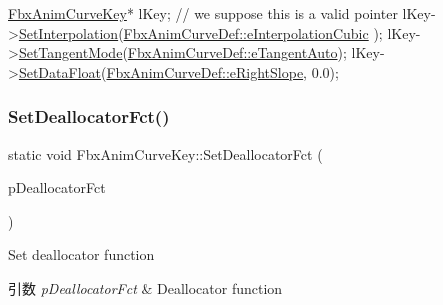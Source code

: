 \begin{DoxyCode}
\hyperlink{class_fbx_anim_curve_key}{FbxAnimCurveKey}* lKey; \textcolor{comment}{// we suppose this is a valid pointer}
lKey->\hyperlink{class_fbx_anim_curve_key_a10777e9392725191bd6ab1d425460406}{SetInterpolation}(\hyperlink{class_fbx_anim_curve_def_add2ab7d10d856ab0868cc9b143d59ea5a16ef50fcdbb8ae99246f06e12f9d3dae}{FbxAnimCurveDef::eInterpolationCubic}
      );
lKey->\hyperlink{class_fbx_anim_curve_key_a8a8a090694fc042e9b234e40918faf8e}{SetTangentMode}(\hyperlink{class_fbx_anim_curve_def_ac810ccc5ca0527704ab5175479964b87a56e3bad364851277281e94e81327dd25}{FbxAnimCurveDef::eTangentAuto});
lKey->\hyperlink{class_fbx_anim_curve_key_ad61a4843c52e4ba3a21102c577950dc5}{SetDataFloat}(\hyperlink{class_fbx_anim_curve_def_a3be261d961f8226235529b148cf80300a97c20bbd5b06a532773ffd8c88624ec2}{FbxAnimCurveDef::eRightSlope}, 0.0);
\end{DoxyCode}
 \mbox{\label{class_fbx_anim_curve_key_a340a84d3e66d6e679232954850414f9c}} 
\subsubsection{\texorpdfstring{Set\+Deallocator\+Fct()}{SetDeallocatorFct()}}
{\footnotesize\ttfamily static void Fbx\+Anim\+Curve\+Key\+::\+Set\+Deallocator\+Fct (\begin{DoxyParamCaption}\item[{void($\ast$)(\hyperlink{class_fbx_anim_curve_key___impl}{Fbx\+Anim\+Curve\+Key\+\_\+\+Impl} $\ast$)}]{p\+Deallocator\+Fct }\end{DoxyParamCaption})\hspace{0.3cm}{\ttfamily [static]}}

Set deallocator function 
\begin{DoxyParams}{引数}
{\em p\+Deallocator\+Fct} & Deallocator function \\
\hline
\end{DoxyParams}
\mbox{\label{class_fbx_anim_curve_key_a10777e9392725191bd6ab1d425460406}} 

